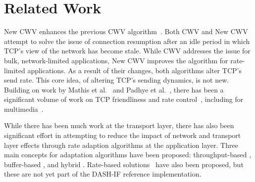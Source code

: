 \documentclass[10pt,sigconf,anonymous]{acmart}
\begin{document}

\section{Related Work}
\label{sec:related}

New CWV enhances the previous CWV algorithm~\cite{rfc2861-2000-padhye-congestion-window-validation}. Both CWV and New CWV attempt to solve the issue of connection resumption after an idle period in which TCP's view of the network has become stale. While CWV addresses the issue for bulk, network-limited applications, New CWV improves the algorithm for rate-limited applications. As a result of their changes, both algorithms alter TCP's send rate. This core idea, of altering TCP's sending dynamics, is not new. Building on work by Mathis et al.~\cite{Mathis-1997-the-macroscopic-behavior-tcp} and Padhye et al.~\cite{Padhye-1998-modelling-tcp-throughput}, there has been a significant volume of work on TCP friendliness and rate control~\cite{rfc-5348-tfrc,Rossi-2010-ledbat,Arun-2018-copa}, including for multimedia~\cite{Carlucci-2016-Analysis-WebRTC,Choi-2007-fairer-tfrc}.

While there has been much work at the transport layer, there has also been significant effort in attempting to reduce the impact of network and transport layer effects through rate adaption algorithms at the application layer. Three main concepts for adaptation algorithms have been proposed: throughput-based \cite{Sun-2016-cs2p, Jiang-2012-improving-fairness-http-video-festive}, buffer-based \cite{Spiteri-2016-BOLA,Huang-2015-A-buffer-based-approach-to-rate-adaptation-bba}, and hybrid \cite{Spiteri-2019-from-theory-to-practice-sabre,Wang-2016-squad}. Rate-based solutions~\cite{Li-2014-probe-and-adapt-panda,Liu-2011-rate-adaptation} have also been proposed, but these are not yet part of the DASH-IF reference implementation.
\end{document}
